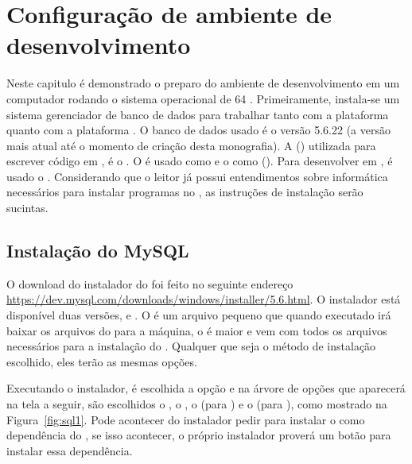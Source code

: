 \chapter{Configuração de ambiente de desenvolvimento}

Neste capitulo é demonstrado o preparo do ambiente de desenvolvimento em um computador rodando o sistema operacional  de 64 . Primeiramente, instala-se um sistema gerenciador de banco de dados para trabalhar tanto com a plataforma \spring quanto com a plataforma \anmvc.  O banco de dados usado é o  versão 5.6.22 (a versão mais atual até o momento de criação desta monografia). A  () utilizada  para escrever código em , é o . O  é usado como  e o  como   (). Para desenvolver em , é usado o . Considerando que o leitor já possui entendimentos sobre informática necessários para instalar programas no , as instruções de instalação serão sucintas. 

\section{Instalação do MySQL}

O download do instalador do  foi feito no seguinte endereço \url{https://dev.mysql.com/downloads/windows/installer/5.6.html}. O instalador está disponível duas versões,  e . O  é um arquivo pequeno que quando executado irá baixar os arquivos do  para a máquina, o  é maior e vem com todos os arquivos necessários para a  instalação do . Qualquer que seja o método de instalação escolhido, eles terão as mesmas opções.

Executando o instalador, é escolhida a opção  e na árvore de opções que aparecerá na tela a seguir, são escolhidos o , o , o  (para ) e o  (para ), como mostrado na Figura~\ref{fig:sql1}. Pode acontecer do instalador pedir para instalar o  como dependência do , se isso acontecer, o próprio instalador proverá um botão para instalar essa dependência.

